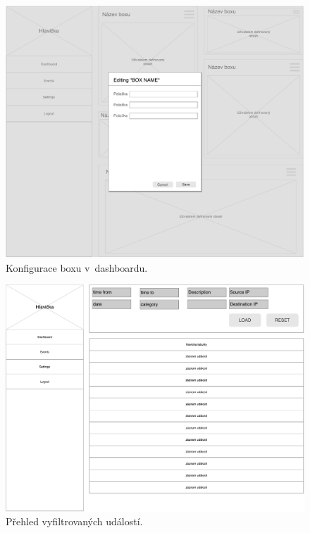 \begin{figure}[ht]
    \centering
    \includegraphics[width=1\textwidth]{fig/wf_dashboard_edit.pdf}
    \caption{Konfigurace boxu v~dashboardu.} \label{wf:dashboard_edit}
\end{figure}


\begin{figure}[ht]
    \centering
    \includegraphics[width=1\textwidth]{fig/wf_dashboard_events.pdf}
    \caption{Přehled vyfiltrovaných událostí.} \label{wf:dashboard_events}
\end{figure}

